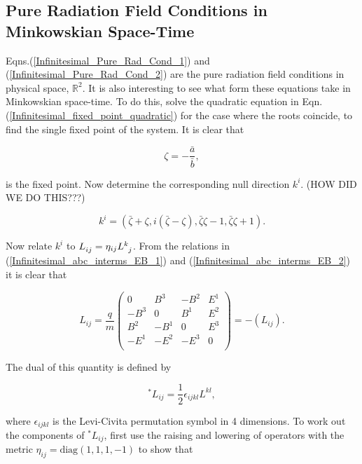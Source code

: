 \subsection{Pure Radiation Field Conditions in Minkowskian Space-Time}

Eqns.(\ref{Infinitesimal_Pure_Rad_Cond_1}) and (\ref{Infinitesimal_Pure_Rad_Cond_2}) are the pure radiation field conditions in physical space, ${\mathbb{R}}^2$. It is also interesting to see what form these equations take in Minkowskian space-time. To do this, solve the quadratic equation in Eqn.(\ref{Infinitesimal_fixed_point_quadratic}) for the case where the roots coincide, to find the single fixed point of the system. It is clear that 

\begin{equation}\label{Infinitesimal_Zeta_Fixed_Point}
\zeta = - \frac{\bar{a}}{\bar{b}},
\end{equation}

\noindent is the fixed point. Now determine the corresponding null direction $k^i$. (HOW DID WE DO THIS???)

\begin{equation*}
k^i = (\bar{\zeta} + \zeta,i(\bar{\zeta} - \zeta),\bar{\zeta}\zeta - 1,\bar{\zeta}\zeta + 1).
\end{equation*}

\noindent Now relate $k^i$ to $\tensor{L}{_i_j} = \eta_{ij} \tensor{L}{^k_j}$. From the relations in (\ref{Infinitesimal_abc_interms_EB_1}) and (\ref{Infinitesimal_abc_interms_EB_2}) it is clear that

\begin{equation*}  
L_{ij} = 
\frac{q}{m}
\left(
\begin{array}{cccc}
0    & B^3  & -B^2 & E^1 \\
-B^3 & 0    & B^1  & E^2 \\
B^2  & -B^1 & 0    & E^3 \\
-E^1 & -E^2 & -E^3 & 0   \\
\end{array}
\right)
=
-(L_{ij}).
\end{equation*}

\noindent The dual of this quantity is defined by

\begin{equation*}
^*L_{ij} = \frac{1}{2} \epsilon_{ijkl} L^{kl},
\end{equation*}

\noindent where $\epsilon_{ijkl}$ is the Levi-Civita permutation symbol in 4 dimensions. To work out the components of $^*L_{ij}$, first use the raising and lowering of operators with the metric $\eta_{ij} = \text{diag}(1,1,1,-1)$ to show that  

